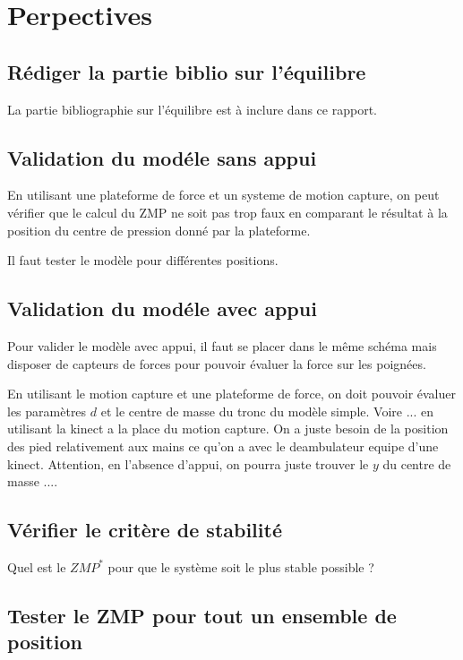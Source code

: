 \documentclass[a4paper, 10pt ]{article}
\begin{document}
\section{Perpectives}

\subsection{Rédiger la partie biblio sur l'équilibre}

La partie bibliographie sur l'équilibre est à inclure dans ce rapport.

\subsection{Validation du modéle sans appui}
En utilisant une plateforme de force et un systeme de motion capture, on peut vérifier que le calcul du ZMP ne soit pas trop faux en comparant le résultat à la position du centre de pression donné par la plateforme.

Il faut tester le modèle pour différentes positions. 

\subsection{Validation du modéle avec appui}

Pour valider le modèle avec appui, il faut se placer dans le même schéma mais disposer de capteurs de forces pour pouvoir évaluer la force sur les poignées.

En utilisant le motion capture et une plateforme de force, on doit pouvoir évaluer les paramètres $d$ et le centre de masse du tronc du modèle simple. Voire ... en utilisant la kinect a la place du motion capture. On a juste besoin de la position des pied relativement aux mains ce qu'on a avec le deambulateur equipe d'une kinect. Attention, en l'absence d'appui, on pourra juste trouver le $y$ du centre de masse .... 

\subsection{Vérifier le critère de stabilité}

Quel est le $ZMP^* $ pour que le système soit le plus stable possible ?

\subsection {Tester le ZMP pour tout un ensemble de position}
\end{document}
